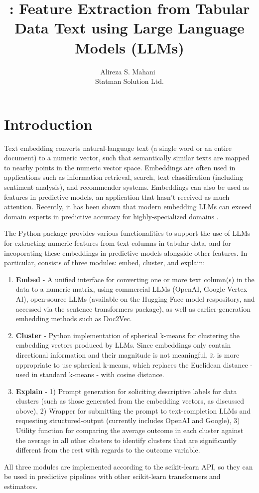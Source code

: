 \documentclass[article]{jss}
\author{Alireza S. Mahani~\orcidlink{0000-0002-7932-6681}\\Statman Solution Ltd.}
\title{\pkg{TabuLLM}: Feature Extraction from Tabular Data Text using Large Language Models (LLMs)}
\begin{document}
\section[Introduction]{Introduction} \label{sec:intro}

Text embedding converts natural-language text (a single word or an entire document) to a numeric vector, such that semantically similar texts are mapped to nearby points in the numeric vector space. Embeddings are often used in applications such as information retrieval, search, text classification (including sentiment analysis), and recommender systems. Embeddings can also be used as features in predictive models, an application that hasn't received as much attention. Recently, it has been shown that modern embedding LLMs can exceed domain experts in predictive accuracy for highly-specialized domains \citep{sharabiani2024genai}. 

The  Python package provides various functionalities to support the use of LLMs for extracting numeric features from text columns in tabular data, and for incoporating these embeddings in predictive models alongside other features. In particular,  consists of three modules: embed, cluster, and explain:
\begin{enumerate}
  \item \textbf{Embed} - A unified interface for converting one or more text column(s) in the data to a numeric matrix, using commercial LLMs (OpenAI, Google Vertex AI), open-source LLMs (available on the Hugging Face model respository, and accessed via the sentence transformers package), as well as earlier-generation embedding methods such as Doc2Vec.
  \item \textbf{Cluster} - Python implementation of spherical k-means for clustering the embedding vectors produced by LLMs. Since embeddings only contain directional information and their magnitude is not meaningful, it is more appropriate to use spherical k-means, which replaces the Euclidean distance - used in standard k-means - with cosine distance.
  \item \textbf{Explain} - 1) Prompt generation for soliciting descriptive labels for data clusters (such as those generated from the embedding vectors, as discussed above), 2) Wrapper for submitting the prompt to text-completion LLMs and requesting structured-output (currently includes OpenAI and Google), 3) Utility function for comparing the average outcome in each cluster against the average in all other clusters to identify clusters that are significantly different from the rest with regards to the outcome variable.
\end{enumerate}
All three modules are implemented according to the scikit-learn API, so they can be used in predictive pipelines with other scikit-learn transformers and estimators.
\end{document}
